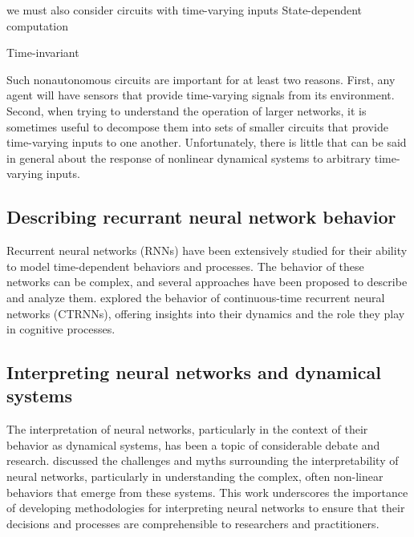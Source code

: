 \documentclass{scrartcl}
\theoremstyle{definition}
\theoremstyle{remark}
\begin{document}
we must also consider circuits with time-varying inputs
State-dependent computation \citep{buonomano2009state}

Time-invariant \citep{goudar2018encoding}

Such nonautonomous circuits are important for at least two reasons. 
First, any agent will have sensors that provide time-varying signals from its environment.
Second, when trying to understand the operation of larger networks, it is sometimes useful to decompose them into sets of smaller circuits that provide time-varying inputs to one another.
Unfortunately, there is little that can be said in general about the response of nonlinear dynamical systems to arbitrary time-varying inputs.



\subsection{Describing recurrant neural network behavior}

Recurrent neural networks (RNNs) have been extensively studied for their ability to model time-dependent behaviors and processes.
 The behavior of these networks can be complex, and several approaches have been proposed to describe and analyze them.
 \cite{beer1995ctrnn, beer1995interaction, beer1995computational, beer2006parameterspace} explored the behavior of continuous-time recurrent neural networks (CTRNNs), offering insights into their dynamics and the role they play in cognitive processes.
   
   
   \citep{ceni2020interpreting}


\subsection{Interpreting neural networks and dynamical systems}
The interpretation of neural networks, particularly in the context of their behavior as dynamical systems, has been a topic of considerable debate and research. \cite{lipton2018mythos} discussed the challenges and myths surrounding the interpretability of neural networks, particularly in understanding the complex, often non-linear behaviors that emerge from these systems. This work underscores the importance of developing methodologies for interpreting neural networks to ensure that their decisions and processes are comprehensible to researchers and practitioners.
\end{document}
